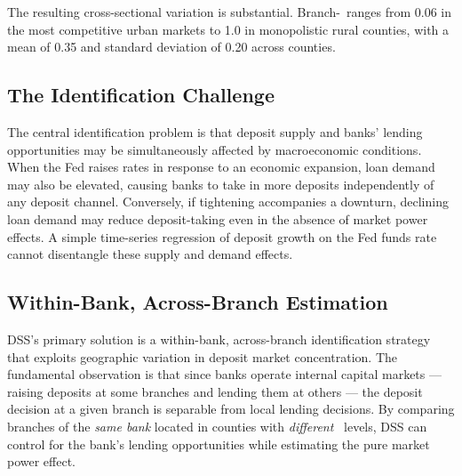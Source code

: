 \documentclass[12pt,a4paper]{article}
\newcommand{\HHI}{\text{HHI}}
\begin{document}
The resulting cross-sectional variation is substantial. Branch-\HHI\ ranges
from 0.06 in the most competitive urban markets to 1.0 in monopolistic rural
counties, with a mean of 0.35 and standard deviation of 0.20 across counties.

\subsection{The Identification Challenge}

The central identification problem is that deposit supply and banks' lending
opportunities may be simultaneously affected by macroeconomic conditions. When
the Fed raises rates in response to an economic expansion, loan demand may
also be elevated, causing banks to take in more deposits independently of any
deposit channel. Conversely, if tightening accompanies a downturn, declining
loan demand may reduce deposit-taking even in the absence of market power
effects. A simple time-series regression of deposit growth on the Fed funds
rate cannot disentangle these supply and demand effects.

\subsection{Within-Bank, Across-Branch Estimation}

DSS's primary solution is a within-bank, across-branch identification strategy
that exploits geographic variation in deposit market concentration. The
fundamental observation is that since banks operate internal capital markets
--- raising deposits at some branches and lending them at others --- the
deposit decision at a given branch is separable from local lending decisions.
By comparing branches of the \emph{same bank} located in counties with
\emph{different} \HHI\ levels, DSS can control for the bank's lending
opportunities while estimating the pure market power effect.
\end{document}

